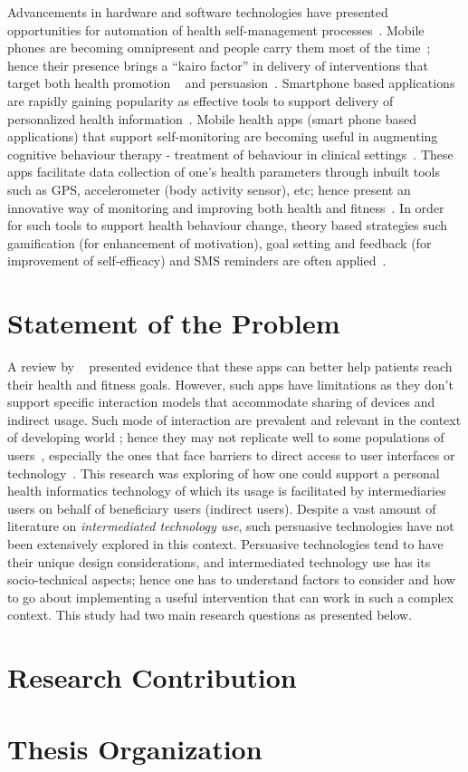 Advancements in hardware and software technologies have presented opportunities for automation of health self-management processes~\citep{arsand:mobile}. Mobile phones are becoming omnipresent and people carry them most of the time~\citep{mattila2008mobile}; hence their presence brings a ``kairo factor'' in delivery of interventions that target both health promotion ~\citep{pollak2010s} and persuasion~\citep{hsu2014persuasive}. Smartphone based applications are rapidly gaining popularity as effective tools to support delivery of personalized health information~\citep{handel2011mhealth}. Mobile health apps (smart phone based applications) that support self-monitoring are becoming useful in augmenting cognitive behaviour therapy - treatment of behaviour in clinical settings~\citep{mattila2008mobile,medynskiy2010salud}. These apps facilitate data collection of one's health parameters through inbuilt tools such as GPS, accelerometer (body activity sensor), etc; hence present an innovative way of monitoring and improving both health and fitness~\citep{higgins2016smartphone}. In order for such tools to support health behaviour change, theory based strategies such gamification (for enhancement of motivation), goal setting and feedback (for improvement of self-efficacy)  and SMS reminders are often applied~\citep{consolvo2009goal,cole2010text,hamari2014persuasive,hamari2014does,higgins2016smartphone}.
\section{Statement of the Problem}
A review by ~\cite{higgins2016smartphone} presented evidence that these apps can better help patients reach their health and fitness goals.
However, such apps have limitations as they don't support specific interaction models that accommodate sharing of devices and indirect usage. Such mode of interaction are prevalent and relevant in the context of developing world ; hence they may not replicate well to some populations of users~\citep{kaplan2006can,sambasivan2010}, especially the ones that face barriers to direct access to user interfaces or technology~\citep{kumar2015mobile}. This research was exploring of how one could support a personal health informatics technology of which its usage is facilitated by intermediaries users on behalf of beneficiary users (indirect users). Despite a vast amount of literature on \emph{intermediated technology use}, such persuasive technologies have not been extensively explored in this context. Persuasive technologies tend to have their unique design considerations, and intermediated technology use has its socio-technical aspects; hence one has to understand factors to consider and how to go about implementing a useful intervention that can work in such a complex context. This study had two main research questions as presented below. 
\section{Research Contribution}
\section{Thesis Organization}

\begin{flushright}
\end{flushright}
